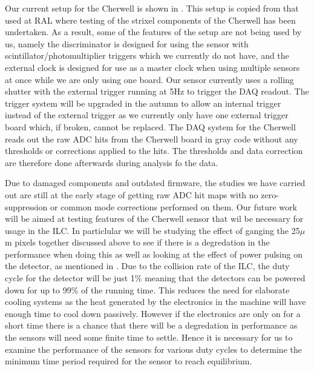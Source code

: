 Our current setup for the Cherwell is shown in . This setup is copied from that used at \ac{RAL} where testing of the strixel components of the Cherwell has been undertaken. As a result, some of the features of the setup are not being used by us, namely the discriminator is designed for using the sensor with scintillator/photomultiplier triggers which we currently do not have, and the external clock is designed for use as a master clock when using multiple sensors at once while we are only using one board. Our sensor currently uses a rolling shutter with the external trigger running at 5Hz to trigger the DAQ readout. The trigger system will be upgraded in the autumn to allow an internal trigger instead of the external trigger as we currently only have one external trigger board which, if broken, cannot be replaced. The DAQ system for the Cherwell reads out the raw ADC hits from the Cherwell board in gray code without any thresholds or corrections applied to the hits. The thresholds and data correction are therefore done afterwards during analysis fo the data.

Due to damaged components and outdated firmware, the studies we have carried out are still at the early stage of getting raw ADC hit maps with no zero-suppression or common mode corrections performed on them. Our future work will be aimed at testing features of the Cherwell sensor that wil be necessary for usage in the \ac{ILC}. In particlular we will be studying the effect of ganging the 25${\mu}$m pixels together discussed above to see if there is a degredation in the performance when doing this as well as looking at the effect of power pulsing on the detector, as mentioned in . Due to the collision rate of the \ac{ILC}, the duty cycle for the detector will be just 1\% meaning that the detectors can be powered down for up to 99\% of the running time. This reduces the need for elaborate cooling systems as the heat generated by the electronics in the machine will have enough time to cool down passively. However if the electronics are only on for a short time there is a chance that there will be a degredation in performance as the sensors will need some finite time to settle. Hence it is necessary for us to examine the performance of the sensors for various duty cycles to determine the minimum time period required for the sensor to reach equilibrium. 

